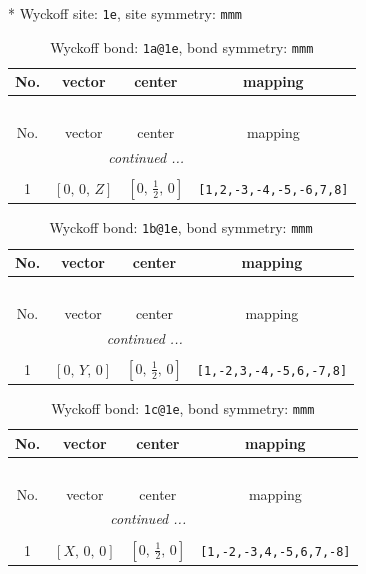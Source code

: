 \documentclass[fleqn,8pt]{jsarticle}
\begin{document}
* Wyckoff site: {\tt 1e}, site symmetry: {\tt mmm}
\renewcommand{\arraystretch}{1.2}
\begin{longtable}{cccc}
\caption{Wyckoff bond: {\tt 1a@1e}, bond symmetry: {\tt mmm}}
 \\
 \hline \hline
No. & vector & center & mapping \\ \hline \endfirsthead

\multicolumn{3}{l}{\tablename\ \thetable{}} \\
 \hline \hline
No. & vector & center & mapping \\ \hline \endhead

 \hline \hline
\multicolumn{3}{r}{\footnotesize\it continued ...} \\ \endfoot

 \hline \hline
\multicolumn{3}{r}{} \\ \endlastfoot

1 & $\left[ 0,\, 0,\, Z \right]$ & $\left[ 0,\, \frac{1}{2},\, 0 \right]$ & {\tt [1,2,-3,-4,-5,-6,7,8]} \\
\end{longtable}
\renewcommand{\arraystretch}{1.2}
\begin{longtable}{cccc}
\caption{Wyckoff bond: {\tt 1b@1e}, bond symmetry: {\tt mmm}}
 \\
 \hline \hline
No. & vector & center & mapping \\ \hline \endfirsthead

\multicolumn{3}{l}{\tablename\ \thetable{}} \\
 \hline \hline
No. & vector & center & mapping \\ \hline \endhead

 \hline \hline
\multicolumn{3}{r}{\footnotesize\it continued ...} \\ \endfoot

 \hline \hline
\multicolumn{3}{r}{} \\ \endlastfoot

1 & $\left[ 0,\, Y,\, 0 \right]$ & $\left[ 0,\, \frac{1}{2},\, 0 \right]$ & {\tt [1,-2,3,-4,-5,6,-7,8]} \\
\end{longtable}
\renewcommand{\arraystretch}{1.2}
\begin{longtable}{cccc}
\caption{Wyckoff bond: {\tt 1c@1e}, bond symmetry: {\tt mmm}}
 \\
 \hline \hline
No. & vector & center & mapping \\ \hline \endfirsthead

\multicolumn{3}{l}{\tablename\ \thetable{}} \\
 \hline \hline
No. & vector & center & mapping \\ \hline \endhead

 \hline \hline
\multicolumn{3}{r}{\footnotesize\it continued ...} \\ \endfoot

 \hline \hline
\multicolumn{3}{r}{} \\ \endlastfoot

1 & $\left[ X,\, 0,\, 0 \right]$ & $\left[ 0,\, \frac{1}{2},\, 0 \right]$ & {\tt [1,-2,-3,4,-5,6,7,-8]} \\
\end{longtable}
\end{document}
